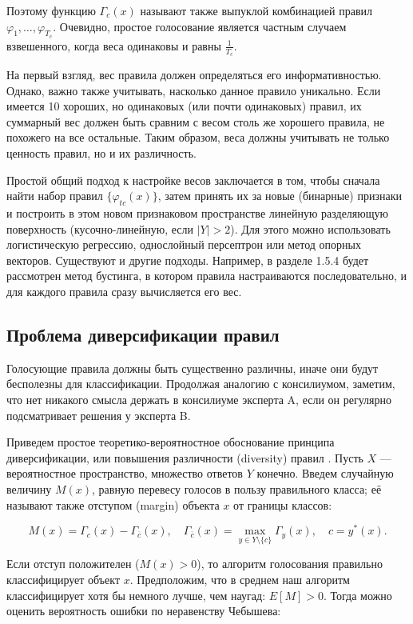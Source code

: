 Поэтому функцию $\Gamma_c(x)$ называют также выпуклой комбинацией правил $\varphi_1, \dots, \varphi_{T_c}$. Очевидно, простое голосование является частным случаем взвешенного, когда веса одинаковы и равны $\frac{1}{T_c}$.

На первый взгляд, вес правила должен определяться его информативностью. Однако, важно также учитывать, насколько данное правило уникально. Если имеется 10 хороших, но одинаковых (или почти одинаковых) правил, их суммарный вес должен быть сравним с весом столь же хорошего правила, не похожего на все остальные. Таким образом, веса должны учитывать не только ценность правил, но и их различность.

Простой общий подход к настройке весов заключается в том, чтобы сначала найти набор правил $\{ \varphi_{tc}(x) \}$, затем принять их за новые (бинарные) признаки и построить в этом новом признаковом пространстве линейную разделяющую поверхность (кусочно-линейную, если $|Y| > 2$). Для этого можно использовать логистическую регрессию, однослойный персептрон или метод опорных векторов. Существуют и другие подходы. Например, в разделе 1.5.4 будет рассмотрен метод бустинга, в котором правила настраиваются последовательно, и для каждого правила сразу вычисляется его вес.

\subsection{Проблема диверсификации правил}
Голосующие правила должны быть существенно различны, иначе они будут бесполезны для классификации. Продолжая аналогию с консилиумом, заметим, что нет никакого смысла держать в консилиуме эксперта A, если он регулярно подсматривает решения у эксперта B.

Приведем простое теоретико-вероятностное обоснование принципа диверсификации, или повышения различности (diversity) правил \cite{14}. Пусть $X$ — вероятностное пространство, множество ответов $Y$ конечно. Введем случайную величину $M(x)$, равную перевесу голосов в пользу правильного класса; её называют также отступом (margin) объекта $x$ от границы классов:

\[
    M(x) = \Gamma_c(x) - \Gamma_{\overline{c}}(x), \quad \Gamma_{\overline{c}}(x) = \max_{y \in Y \setminus \{c\}} \Gamma_y(x), \quad c = y^*(x).
\]

Если отступ положителен ($M(x) > 0$), то алгоритм голосования правильно классифицирует объект $x$. Предположим, что в среднем наш алгоритм классифицирует хотя бы немного лучше, чем наугад: $E[M] > 0$. Тогда можно оценить вероятность ошибки по неравенству Чебышева:

